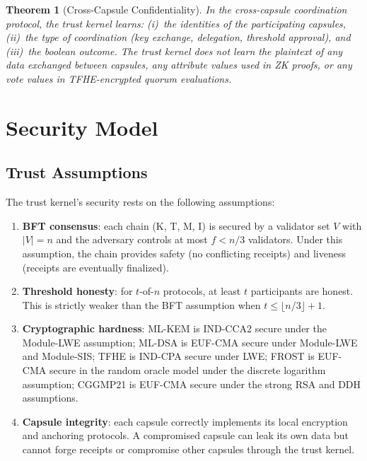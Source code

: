 \documentclass[11pt,a4paper]{article}
\newtheorem{theorem}{Theorem}[section]
\begin{document}
\begin{theorem}[Cross-Capsule Confidentiality]\label{thm:cross-capsule}
In the cross-capsule coordination protocol, the trust kernel learns:
(i)~the identities of the participating capsules, (ii)~the type of
coordination (key exchange, delegation, threshold approval), and
(iii)~the boolean outcome. The trust kernel does not learn the plaintext
of any data exchanged between capsules, any attribute values used in
ZK proofs, or any vote values in TFHE-encrypted quorum evaluations.
\end{theorem}

\section{Security Model}\label{sec:security}

\subsection{Trust Assumptions}

The trust kernel's security rests on the following assumptions:

\begin{enumerate}
    \item \textbf{BFT consensus}: each chain (K, T, M, I) is secured by a
          validator set $V$ with $|V| = n$ and the adversary controls at most
          $f < n/3$ validators. Under this assumption, the chain provides
          safety (no conflicting receipts) and liveness (receipts are eventually
          finalized).
    \item \textbf{Threshold honesty}: for $t$-of-$n$ protocols, at least $t$
          participants are honest. This is strictly weaker than the BFT
          assumption when $t \leq \lfloor n/3 \rfloor + 1$.
    \item \textbf{Cryptographic hardness}: ML-KEM is IND-CCA2 secure under the
          Module-LWE assumption; ML-DSA is EUF-CMA secure under Module-LWE and
          Module-SIS; TFHE is IND-CPA secure under LWE; FROST is EUF-CMA
          secure in the random oracle model under the discrete logarithm
          assumption; CGGMP21 is EUF-CMA secure under the strong RSA and DDH
          assumptions.
    \item \textbf{Capsule integrity}: each capsule correctly implements its
          local encryption and anchoring protocols. A compromised capsule can
          leak its own data but cannot forge receipts or compromise other
          capsules through the trust kernel.
\end{enumerate}
\end{document}
